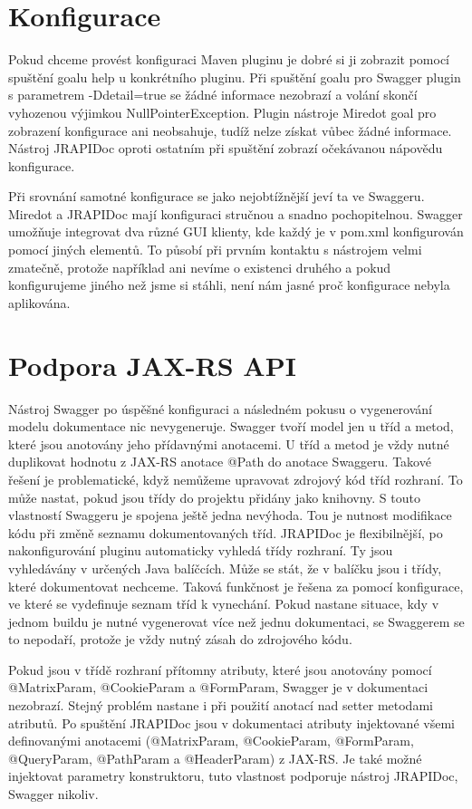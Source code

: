 \documentclass[11pt,twoside,a4paper]{book}
\begin{document}
\section{Konfigurace}

Pokud chceme provést konfiguraci Maven pluginu je dobré si ji zobrazit pomocí spuštění
goalu help u konkrétního pluginu. Při spuštění goalu pro Swagger plugin s parametrem
-Ddetail=true se žádné informace nezobrazí a volání skončí vyhozenou výjimkou
NullPointerException. Plugin nástroje Miredot goal pro zobrazení konfigurace ani
neobsahuje, tudíž nelze získat vůbec žádné informace. Nástroj JRAPIDoc oproti
ostatním při spuštění zobrazí očekávanou nápovědu konfigurace.

Při srovnání samotné konfigurace se jako nejobtížnější jeví ta ve Swaggeru. Miredot a
JRAPIDoc mají konfiguraci stručnou a snadno pochopitelnou. Swagger umožňuje
integrovat dva různé GUI klienty, kde každý je v pom.xml konfigurován pomocí
jiných elementů. To působí při prvním kontaktu s nástrojem velmi zmatečně,
protože například ani nevíme o existenci druhého a pokud konfigurujeme jiného
než jsme si stáhli, není nám jasné proč konfigurace nebyla aplikována.

\section{Podpora JAX-RS API}

Nástroj Swagger po úspěšné konfiguraci a následném pokusu o vygenerování modelu
dokumentace nic nevygeneruje. Swagger tvoří model jen u tříd a metod, které
jsou anotovány jeho přídavnými anotacemi. U tříd a metod je vždy nutné
duplikovat hodnotu z JAX-RS anotace @Path do anotace Swaggeru. Takové řešení je
problematické, když nemůžeme upravovat zdrojový kód tříd rozhraní. To může
nastat, pokud jsou třídy do projektu přidány jako knihovny. S touto vlastností
Swaggeru je spojena ještě jedna nevýhoda. Tou je nutnost modifikace kódu při změně seznamu
dokumentovaných tříd. JRAPIDoc je flexibilnější, po nakonfigurování pluginu automaticky vyhledá třídy rozhraní.
Ty jsou vyhledávány v určených Java balíčcích. Může se stát, že v balíčku jsou i třídy, které
dokumentovat nechceme. Taková funkčnost je řešena za pomocí konfigurace, ve
které se vydefinuje seznam tříd k vynechání. Pokud nastane situace, kdy v jednom
buildu je nutné vygenerovat více než jednu dokumentaci, se Swaggerem se to
nepodaří, protože je vždy nutný zásah do zdrojového kódu.

Pokud jsou v třídě rozhraní přítomny atributy, které jsou anotovány pomocí 
@MatrixParam, @CookieParam a @FormParam, Swagger je v dokumentaci
nezobrazí. Stejný problém nastane i při použití anotací nad setter metodami
atributů. Po spuštění JRAPIDoc jsou v dokumentaci atributy injektované všemi
definovanými anotacemi (@MatrixParam, @CookieParam, @FormParam, @QueryParam,
@PathParam a @HeaderParam) z JAX-RS. Je také možné injektovat parametry
konstruktoru, tuto vlastnost podporuje nástroj JRAPIDoc, Swagger nikoliv.
\end{document}
